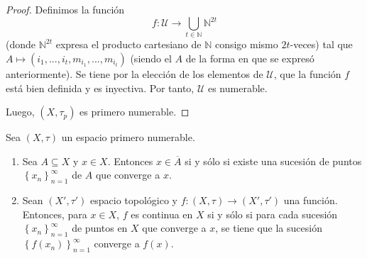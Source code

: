 \documentclass[12pt]{report}
\theoremstyle{largebreak}
\newcommand\cf[3]{\ensuremath{#1:#2\rightarrow#3}}
\newcommand{\Cls}[1]{\ensuremath{\overline{#1}}}
\begin{document}
\begin{proof}
        Definimos la función
        \begin{equation*}
            \cf{f}{\mathcal{U}}{\bigcup_{t\in\mathbb{N}}\mathbb{N}^{2t}}
        \end{equation*}
        (donde $\mathbb{N}^{ 2t}$ expresa el producto cartesiano de $\mathbb{N}$ consigo mismo $2t$-veces) tal que $A\mapsto (i_1,...,i_t,m_{i_1},...,m_{i_t})$ (siendo el $A$ de la forma en que se expresó anteriormente). Se tiene por la elección de los elementos de $\mathcal{U}$, que la función $f$ está bien definida y es inyectiva. Por tanto, $\mathcal{U}$ es numerable.

        Luego, $(X,\tau_p)$ es primero numerable.
    \end{proof}

    \begin{propo}
        Sea $(X,\tau)$ un espacio primero numerable.
        \begin{enumerate}
            \item Sea $A\subseteq X$ y $x\in X$. Entonces $x\in\Cls{A}$ si y sólo si existe una sucesión de puntos $\left\{x_n \right\}_{ n=1}^\infty$ de $A$ que converge a $x$.
            \item Sean $(X',\tau')$ espacio topológico y $\cf{f}{(X,\tau)}{(X',\tau')}$ una función. Entonces, para $x\in X$, $f$ es continua en $X$ si y sólo si para cada sucesión $\left\{ x_n\right\}_{ n=1}^\infty$ de puntos en $X$ que converge a $x$, se tiene que la sucesión $\left\{f(x_n) \right\}_{ n=1}^\infty$ converge a $f(x)$.
        \end{enumerate}
    \end{propo}
\end{document}
